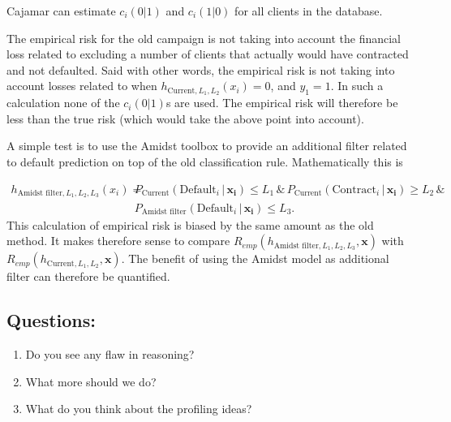 \documentclass{article}
\theoremstyle{theorem}
\theoremstyle{definition}
\newcommand{\bv}[1]{\bm{#1}}
\begin{document}
{Cajamar can estimate $c_i(0|1)$ and $c_i(1|0)$ for all clients in the database.


The empirical risk for the old campaign is not taking into account the financial loss related to excluding a number of clients that actually would have contracted and not defaulted.  Said with other words, the empirical risk is not taking into account losses related to when $h_{\mbox{Current},L_1,L_2}(x_i) = 0$, and $y_1 = 1$.  In such a calculation none of the $c_i(0|1)$s are used.  The empirical risk will therefore be less than the true risk (which would take the above point into account).

A simple test is to use the Amidst toolbox to provide an additional filter related to default prediction on top of the old classification rule.  Mathematically this is

\begin{equation}
\begin{split}
\label{eq:filter}
h_{\mbox{Amidst filter},L_1,L_2,L_3}(x_i) = &
P_{\mbox{Current}}(\mbox{Default}_i \,|\, \bv{x_i}) \leq L_1
 \, \& \,
P_{\mbox{Current}}(\mbox{Contract}_i \,|\, \bv{x_i}) \geq L_2
\, \& \,  
\\ &
P_{\mbox{Amidst filter}}(\mbox{Default}_i \,|\, \bv{x_i}) \leq L_3.
\end{split}
\end{equation}
This calculation of empirical risk is biased by the same amount as the old method.  It makes therefore sense to compare $R_{emp}(h_{\mbox{Amidst filter},L_1,L_2,L_3}, \bv{x}) $ with $R_{emp}(h_{\mbox{Current},L_1,L_2}, \bv{x}) $.
The benefit of using the Amidst model as additional filter can therefore be quantified.

\subsection*{Questions: }
\begin{enumerate}
\item Do you see any flaw in reasoning?
\item What more should we do?
\item What do you think about the profiling ideas?
\end{enumerate}

}





\end{document}
